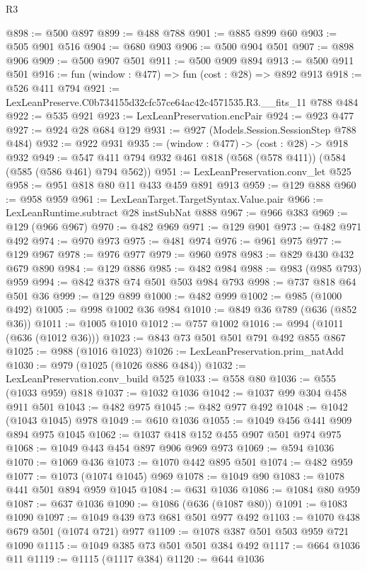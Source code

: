 \begin{lexlean}{R3}
\begin{coremodule}
@898 := @500 @897
@899 := @488 @788
@901 := @885 @899 @60
@903 := @505 @901 @516
@904 := @680 @903
@906 := @500 @904 @501
@907 := @898 @906
@909 := @500 @907 @501
@911 := @500 @909 @894
@913 := @500 @911 @501
@916 := fun (window : @477) => fun (cost : @28) => @892 @913
@918 := @526 @411 @794
@921 := LexLeanPreserve.C0b734155d32cfc57ce64ac42c4571535.R3.__fits_11 @788 @484
@922 := @535 @921
@923 := LexLeanPreservation.encPair
@924 := @923 @477
@927 := @924 @28 @684 @129
@931 := @927 (Models.Session.SessionStep @788 @484)
@932 := @922 @931
@935 := (window : @477) -> (cost : @28) -> @918 @932
@949 := @547 @411 @794 @932 @461 @818 (@568 (@578 @411)) (@584 (@585 (@586 @461) @794 @562))
@951 := LexLeanPreservation.conv_let @525
@958 := @951 @818 @80 @11 @433 @459 @891 @913
@959 := @129 @888
@960 := @958 @959
@961 := LexLeanTarget.TargetSyntax.Value.pair
@966 := LexLeanRuntime.subtract @28 instSubNat @888
@967 := @966 @383
@969 := @129 (@966 @967)
@970 := @482 @969
@971 := @129 @901
@973 := @482 @971 @492
@974 := @970 @973
@975 := @481 @974
@976 := @961 @975
@977 := @129 @967
@978 := @976 @977
@979 := @960 @978
@983 := @829 @430 @432 @679 @890
@984 := @129 @886
@985 := @482 @984
@988 := @983 (@985 @793) @959
@994 := @842 @378 @74 @501 @503 @984 @793
@998 := @737 @818 @64 @501 @36
@999 := @129 @899
@1000 := @482 @999
@1002 := @985 (@1000 @492)
@1005 := @998 @1002 @36 @984
@1010 := @849 @36 @789 (@636 (@852 @36))
@1011 := @1005 @1010
@1012 := @757 @1002
@1016 := @994 (@1011 (@636 (@1012 @36)))
@1023 := @843 @73 @501 @501 @791 @492 @855 @867
@1025 := @988 (@1016 @1023)
@1026 := LexLeanPreservation.prim_natAdd
@1030 := @979 (@1025 (@1026 @886 @484))
@1032 := LexLeanPreservation.conv_build @525
@1033 := @558 @80
@1036 := @555 (@1033 @959) @818
@1037 := @1032 @1036
@1042 := @1037 @99 @304 @458 @911 @501
@1043 := @482 @975
@1045 := @482 @977 @492
@1048 := @1042 (@1043 @1045) @978
@1049 := @610 @1036
@1055 := @1049 @456 @441 @909 @894 @975 @1045
@1062 := @1037 @418 @152 @455 @907 @501 @974 @975
@1068 := @1049 @443 @454 @897 @906 @969 @973
@1069 := @594 @1036
@1070 := @1069 @436
@1073 := @1070 @442 @895 @501
@1074 := @482 @959
@1077 := @1073 (@1074 @1045) @969
@1078 := @1049 @90
@1083 := @1078 @441 @501 @894 @959 @1045
@1084 := @631 @1036
@1086 := @1084 @80 @959
@1087 := @637 @1036
@1090 := @1086 (@636 (@1087 @80))
@1091 := @1083 @1090
@1097 := @1049 @439 @73 @681 @501 @977 @492
@1103 := @1070 @438 @679 @501 (@1074 @721) @977
@1109 := @1078 @387 @501 @503 @959 @721 @1090
@1115 := @1049 @385 @73 @501 @501 @384 @492
@1117 := @664 @1036 @11
@1119 := @1115 (@1117 @384)
@1120 := @644 @1036

\end{coremodule}
\end{lexlean}
